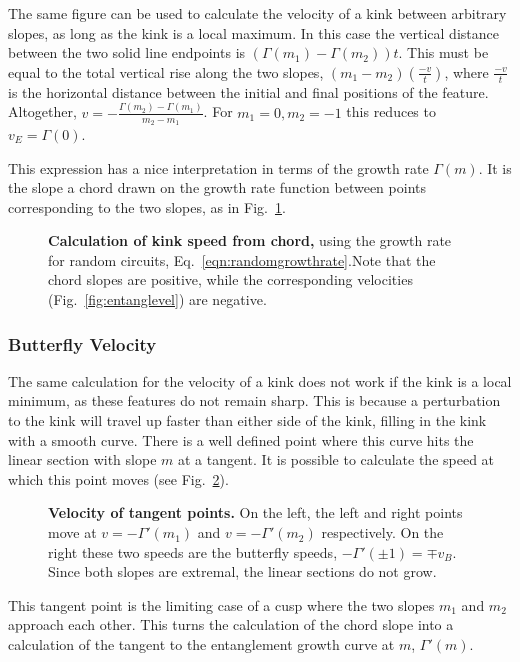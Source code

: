 The same figure can be used to calculate the velocity of a kink between arbitrary slopes, as long as the kink is a local maximum. In this case the vertical distance between the two solid line endpoints is $(\Gamma(m_1)-\Gamma(m_2))t$. This must be equal to the total vertical rise along the two slopes, $(m_1-m_2)\left(\frac{-v}{t}\right)$, where $\frac{-v}{t}$ is the horizontal distance between the initial and final positions of the feature. Altogether, $v=-\frac{\Gamma(m_2)-\Gamma(m_1)}{m_2-m_1}$. For $m_1=0, m_2=-1$ this reduces to $v_E=\Gamma(0)$.

This expression has a nice interpretation in terms of the growth rate $\Gamma(m)$. It is the slope a chord drawn on the growth rate function between points corresponding to the two slopes, as in Fig.~\ref{fig:growthchord}.
\begin{figure}
	\centering
	
	\caption{\textbf{Calculation of kink speed from chord,} using the growth rate for random circuits, Eq.~\ref{eqn:randomgrowthrate}.Note that the chord slopes are positive, while the corresponding velocities (Fig.~\ref{fig:entanglevel}) are negative.}
	\label{fig:growthchord}
\end{figure}

\subsubsection{Butterfly Velocity} \label{subsub:v_B}

The same calculation for the velocity of a kink does not work if the kink is a local minimum, as these features do not remain sharp. This is because a perturbation to the kink will travel up faster than either side of the kink, filling in the kink with a smooth curve. There is a well defined point where this curve hits the linear section with slope $m$ at a tangent. It is possible to calculate the speed at which this point moves (see Fig.~\ref{fig:buttvel}).
\begin{figure}
	\centering
	
	\caption{\textbf{Velocity of tangent points.} On the left, the left and right points move at $v=-\Gamma'(m_1)$ and $v=-\Gamma'(m_2)$ respectively. On the right these two speeds are the butterfly speeds, $-\Gamma'(\pm1) = \mp v_B$. Since both slopes are extremal, the linear sections do not grow.}
	\label{fig:buttvel}
\end{figure}
This tangent point is the limiting case of a cusp where the two slopes $m_1$ and $m_2$ approach each other. This turns the calculation of the chord slope into a calculation of the tangent to the entanglement growth curve at $m$, $\Gamma'(m)$. 

